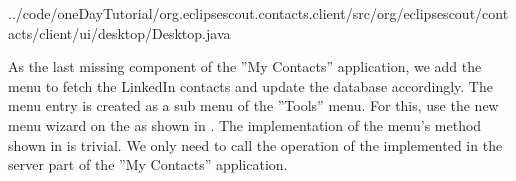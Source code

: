 \documentclass[a4paper,10pt,twoside]{book}
\begin{document}

{../code/oneDayTutorial/org.eclipsescout.contacts.client/src/org/eclipsescout/contacts/client/ui/desktop/Desktop.java}

As the last missing component of the ''My Contacts'' application, we add the menu to fetch the LinkedIn contacts and update the database accordingly. 
The menu entry is created as a sub menu of the ''Tools'' menu.
For this, use the new menu wizard on the  as shown in . 
The implementation of the menu's  method shown in  is trivial. 
We only need to call the operation of the  implemented in the server part of the ''My Contacts'' application. 

\ifx\wholebook\relax\else
   
   
\end{document}
